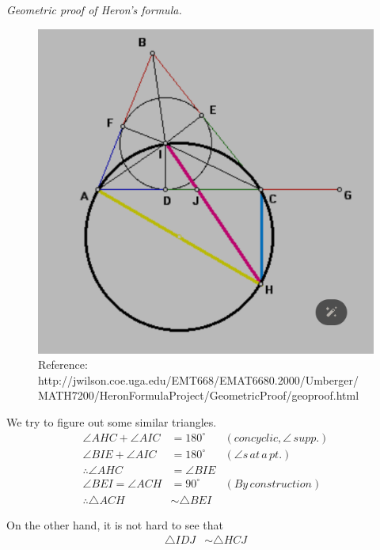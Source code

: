 \documentclass[12pt]{article}
\renewenvironment{proof}[1][Proof]{\begin{snugshade*} \textit{{#1}.}\\}{\hfill \qedsymbol \end{snugshade*}}
\begin{document}
\begin{proof}[Geometric proof of Heron's formula]
        \begin{figure}[H]
            \centering
            \includegraphics[scale=1.5]{heron_circle.png}
            \caption{Reference: http://jwilson.coe.uga.edu/EMT668/EMAT6680.2000/Umberger/\\MATH7200/HeronFormulaProject/GeometricProof/geoproof.html}
        \end{figure}

        We try to figure out some similar triangles.\begin{align*}
            \angle AHC + \angle AIC &= 180^\circ &(concyclic, \angle \, supp.)\\
            \angle BIE + \angle AIC &= 180^\circ &(\angle s\, at\, a\, pt.)\\
            \therefore \angle AHC &= \angle BIE\\
            \angle BEI = \angle ACH &= 90^\circ &(By \, construction)\\
            \therefore \triangle ACH &\sim \triangle BEI
        \end{align*}

        On the other hand, it is not hard to see that \begin{align*}
            \triangle IDJ &\sim \triangle HCJ
        \end{align*}


\end{proof}
\end{document}

